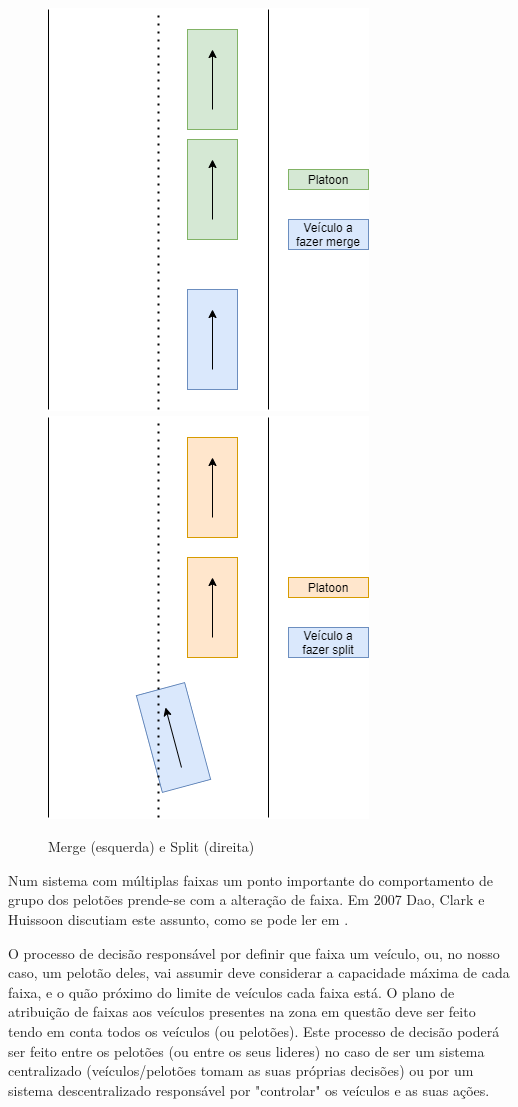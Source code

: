 \begin{figure}[H]
    \centering
    \includegraphics[scale=0.4]{Images/Merge.png}
    \includegraphics[scale=0.4]{Images/Split.png}
    \caption{Merge (esquerda) e Split (direita)}
    \label{fig:my_label}
\end{figure}

Num sistema com múltiplas faixas um ponto importante do comportamento de grupo dos pelotões prende-se com a alteração de faixa. Em 2007 Dao, Clark e Huissoon discutiam este assunto, como se pode ler em \cite{cite10,citeE4}.

O processo de decisão responsável por definir que faixa um veículo, ou, no nosso caso, um pelotão deles, vai assumir deve considerar a capacidade máxima de cada faixa, e o quão próximo do limite de veículos cada faixa está. O plano de atribuição de faixas aos veículos presentes na zona em questão deve ser feito tendo em conta todos os veículos (ou pelotões). Este processo de decisão poderá ser feito entre os pelotões (ou entre os seus lideres) no caso de ser um sistema centralizado (veículos/pelotões tomam as suas próprias decisões) ou por um sistema descentralizado responsável por "controlar" os veículos e as suas ações. 
